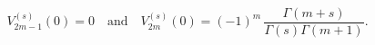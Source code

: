 \begin{equation}
V_{2m-1}^{(s)}(0)=0\quad\text{and}\quad
V_{2m}^{(s)}(0)=(-1)^m\,\frac{\Gamma(m+s)}{\Gamma(s)\Gamma(m+1)}.
\label{C3''}
\end{equation}

